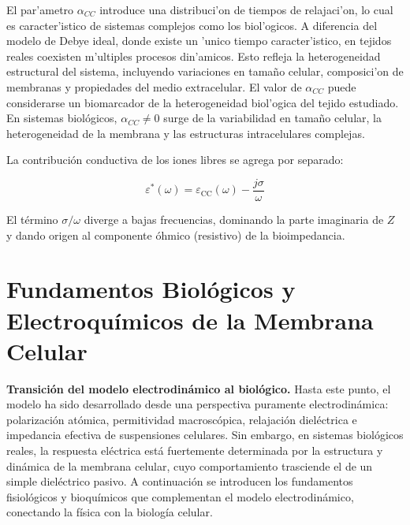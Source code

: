 \documentclass[12pt]{article}
\begin{document}
El par'ametro $\alpha_{CC}$ introduce una distribuci'on de tiempos de relajaci'on,
lo cual es caracter'istico de sistemas complejos como los biol'ogicos. A diferencia
del modelo de Debye ideal, donde existe un 'unico tiempo caracter'istico, en tejidos
reales coexisten m'ultiples procesos din'amicos. Esto refleja la heterogeneidad
estructural del sistema, incluyendo variaciones en tama\~{n}o celular, composici'on
de membranas y propiedades del medio extracelular. El valor de $\alpha_{CC}$ puede
considerarse un biomarcador de la heterogeneidad biol'ogica del tejido estudiado. En sistemas
biol\'ogicos,
$\alpha_{CC} \neq 0$ surge de la variabilidad en tama\~{n}o celular, la heterogeneidad de la
membrana y las estructuras intracelulares complejas.

La contribuci\'on conductiva de los iones libres se agrega por separado:

\begin{equation}
\varepsilon^*(\omega) = \varepsilon_{\text{CC}}(\omega) - \frac{j\sigma}{\omega}
\end{equation}

El t\'ermino $\sigma/\omega$ diverge a bajas frecuencias, dominando la parte imaginaria de $Z$ y
dando origen al componente \'ohmico (resistivo) de la bioimpedancia.


\section{Fundamentos Biol\'ogicos y Electroqu\'imicos de la Membrana Celular}

\label{sec:bio_foundations}

\noindent\textbf{Transici\'on del modelo electrodin\'amico al biol\'ogico.}
Hasta este punto, el modelo ha sido desarrollado desde una perspectiva puramente
electrodin\'amica: polarizaci\'on at\'omica, permitividad macrosc\'opica, relajaci\'on
diel\'ectrica e impedancia efectiva de suspensiones celulares. Sin embargo, en sistemas
biol\'ogicos reales, la respuesta el\'ectrica est\'a fuertemente determinada por la estructura
y din\'amica de la membrana celular, cuyo comportamiento trasciende el de un simple
diel\'ectrico pasivo. A continuaci\'on se introducen los fundamentos fisiol\'ogicos y
bioqu\'imicos que complementan el modelo electrodin\'amico, conectando la f\'isica con la
biolog\'ia celular.
\end{document}
